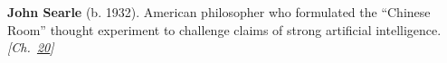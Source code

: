 \textbf{John Searle} (b. 1932). American philosopher who formulated the ``Chinese Room'' thought experiment to challenge claims of strong artificial intelligence. \emph{[Ch.~\hyperref[ch:chineseroomargument]{20}]}

